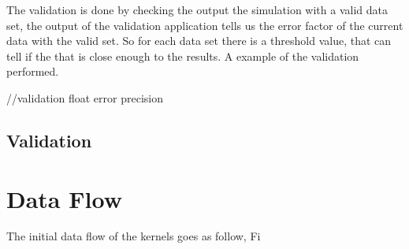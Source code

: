 The validation is done by checking the output the simulation with a valid data set, the output of the validation application tells us the error factor of the current data with the valid set. So for each data set there is a threshold value, that can tell if the that is close enough to the results. A example of the validation performed.

//validation float error precision

\subsection{Validation}




\section{Data Flow}

The initial data flow of the kernels goes as follow, Fi
